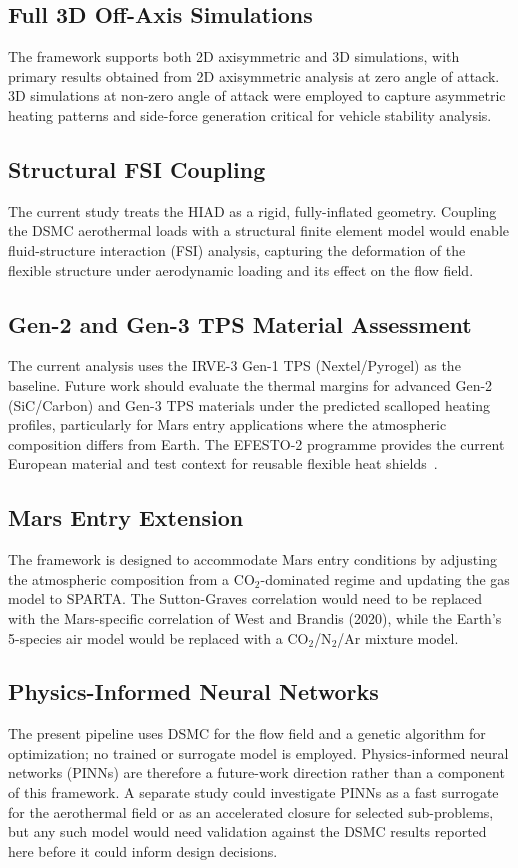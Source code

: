 \subsection{Full 3D Off-Axis Simulations}
The framework supports both 2D axisymmetric and 3D simulations, with primary results obtained from 2D axisymmetric analysis at zero angle of attack. 3D simulations at non-zero angle of attack were employed to capture asymmetric heating patterns and side-force generation critical for vehicle stability analysis.

\subsection{Structural FSI Coupling}
The current study treats the HIAD as a rigid, fully-inflated geometry. Coupling the DSMC aerothermal loads with a structural finite element model would enable fluid-structure interaction (FSI) analysis, capturing the deformation of the flexible structure under aerodynamic loading and its effect on the flow field.

\subsection{Gen-2 and Gen-3 TPS Material Assessment}
The current analysis uses the IRVE-3 Gen-1 TPS (Nextel/Pyrogel) as the baseline. Future work should evaluate the thermal margins for advanced Gen-2 (SiC/Carbon) and Gen-3 TPS materials under the predicted scalloped heating profiles, particularly for Mars entry applications where the atmospheric composition differs from Earth. The EFESTO-2 programme provides the current European material and test context for reusable flexible heat shields~\cite{Guidotti2024EFESTO2}.

\subsection{Mars Entry Extension}
The framework is designed to accommodate Mars entry conditions by adjusting the atmospheric composition from a CO$_2$-dominated regime and updating the gas model to SPARTA. The Sutton-Graves correlation would need to be replaced with the Mars-specific correlation of West and Brandis (2020), while the Earth's 5-species air model would be replaced with a CO$_2$/N$_2$/Ar mixture model.

\subsection{Physics-Informed Neural Networks}
The present pipeline uses DSMC for the flow field and a genetic algorithm for optimization; no trained or surrogate model is employed. Physics-informed neural networks (PINNs) are therefore a future-work direction rather than a component of this framework. A separate study could investigate PINNs as a fast surrogate for the aerothermal field or as an accelerated closure for selected sub-problems, but any such model would need validation against the DSMC results reported here before it could inform design decisions.

